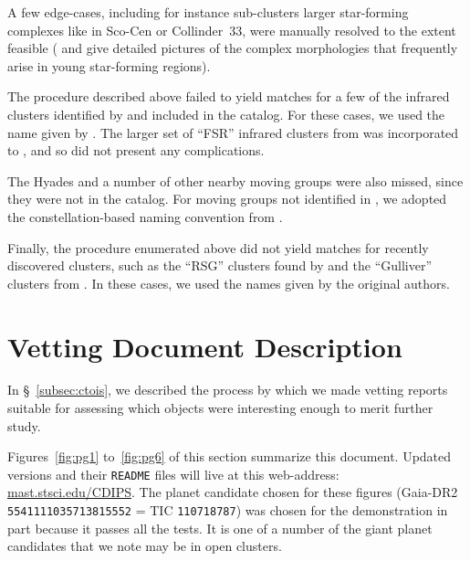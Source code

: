 \documentclass[12pt,twocolumn,tighten]{aastex62}
\begin{document}
A few edge-cases, including for instance sub-clusters  larger
star-forming complexes like in Sco-Cen or Collinder~33, were 
manually resolved to the extent feasible (\citealt{rizzuto_multidimensional_2011}
and \citealt{saurin_isolating_2015} give
detailed pictures of the complex morphologies that frequently arise in
young star-forming regions).

The procedure described above failed to yield matches for a few of the
infrared clusters identified by \citet{majaess_discovering_2013} and
included in the \citet{dias_proper_2014} catalog.
For these cases, we used the name given by \citet{dias_proper_2014}.
The larger set of ``FSR'' infrared clusters from
\citet{froebrich_FSR_2007} was incorporated to
\citet{Kharchenko_et_al_2013}, and so did not present any
complications.

The Hyades and a number of other nearby moving groups were also
missed, since they were not in the \citet{Kharchenko_et_al_2013}
catalog.  For moving groups not identified in
\citet{Kharchenko_et_al_2013}, we adopted the constellation-based
naming convention from \citet{gagne_banyan_XI_2018}.  

Finally, the procedure enumerated above did not yield matches for
recently discovered clusters, such as the ``RSG'' clusters found by
\citet{roser_nine_RSG_2016} and the ``Gulliver'' clusters from
\citet{cantat-gaudin_gaia_2018}.  In these cases, we used the names
given by the original authors.

\section{Vetting Document Description}
\label{appendix:vetreport}

In \S~\ref{subsec:ctois}, we described the process by which we made 
vetting reports suitable for assessing which objects were interesting 
enough to merit further study.

Figures~\ref{fig:pg1} to~\ref{fig:pg6} of this
section summarize this document. Updated versions and their 
\texttt{README} files will live at this web-address: 
\url{mast.stsci.edu/CDIPS}.
The planet candidate chosen for these figures
(Gaia-DR2 \texttt{5541111035713815552} = TIC \texttt{110718787}) was
chosen for the demonstration in part because it passes all
the tests.
It is one of a number of the giant planet candidates that we note may
be in open clusters.
\end{document}
